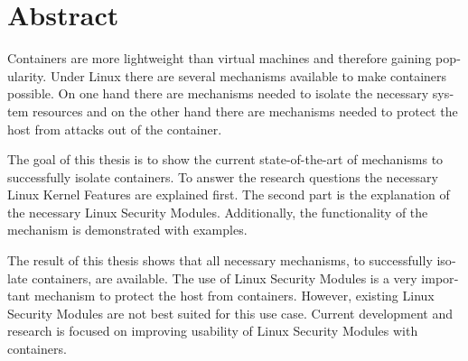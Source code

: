 \chapter{Abstract}

\begin{english} 
Containers are more lightweight than virtual machines and therefore gaining
popularity. Under Linux there are several mechanisms available to make
containers possible. On one hand there are mechanisms needed to isolate the
necessary system resources and on the other hand there are mechanisms needed to
protect the host from attacks out of the container. 

The goal of this thesis is to show the current state-of-the-art of mechanisms
to successfully isolate containers. To answer the research questions the
necessary Linux Kernel Features are explained first. The second part is the
explanation of the necessary Linux Security Modules. Additionally, the
functionality of the mechanism is demonstrated with examples.

The result of this thesis shows that all necessary mechanisms, to successfully
isolate containers, are available. The use of Linux Security Modules is a very
important mechanism to protect the host from containers. However, existing
Linux Security Modules are not best suited for this use case. Current
development and research is focused on improving usability of Linux Security
Modules with containers.
\end{english}